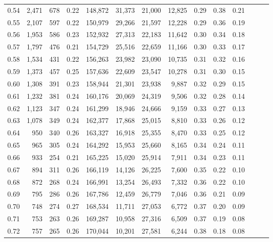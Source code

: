 \begin{tabular}{rrrrrrrrrrrrrr}
0.54 &  2,471 &  678 &  0.22 &  148,872 &   31,373 &  21,000 &  12,825 &  0.29 &  0.38 &      0.21 \\
0.55 &  2,107 &  597 &  0.22 &  150,979 &   29,266 &  21,597 &  12,228 &  0.29 &  0.36 &      0.19 \\
0.56 &  1,953 &  586 &  0.23 &  152,932 &   27,313 &  22,183 &  11,642 &  0.30 &  0.34 &      0.18 \\
0.57 &  1,797 &  476 &  0.21 &  154,729 &   25,516 &  22,659 &  11,166 &  0.30 &  0.33 &      0.17 \\
0.58 &  1,534 &  431 &  0.22 &  156,263 &   23,982 &  23,090 &  10,735 &  0.31 &  0.32 &      0.16 \\
0.59 &  1,373 &  457 &  0.25 &  157,636 &   22,609 &  23,547 &  10,278 &  0.31 &  0.30 &      0.15 \\
0.60 &  1,308 &  391 &  0.23 &  158,944 &   21,301 &  23,938 &   9,887 &  0.32 &  0.29 &      0.15 \\
0.61 &  1,232 &  381 &  0.24 &  160,176 &   20,069 &  24,319 &   9,506 &  0.32 &  0.28 &      0.14 \\
0.62 &  1,123 &  347 &  0.24 &  161,299 &   18,946 &  24,666 &   9,159 &  0.33 &  0.27 &      0.13 \\
0.63 &  1,078 &  349 &  0.24 &  162,377 &   17,868 &  25,015 &   8,810 &  0.33 &  0.26 &      0.12 \\
0.64 &    950 &  340 &  0.26 &  163,327 &   16,918 &  25,355 &   8,470 &  0.33 &  0.25 &      0.12 \\
0.65 &    965 &  305 &  0.24 &  164,292 &   15,953 &  25,660 &   8,165 &  0.34 &  0.24 &      0.11 \\
0.66 &    933 &  254 &  0.21 &  165,225 &   15,020 &  25,914 &   7,911 &  0.34 &  0.23 &      0.11 \\
0.67 &    894 &  311 &  0.26 &  166,119 &   14,126 &  26,225 &   7,600 &  0.35 &  0.22 &      0.10 \\
0.68 &    872 &  268 &  0.24 &  166,991 &   13,254 &  26,493 &   7,332 &  0.36 &  0.22 &      0.10 \\
0.69 &    795 &  286 &  0.26 &  167,786 &   12,459 &  26,779 &   7,046 &  0.36 &  0.21 &      0.09 \\
0.70 &    748 &  274 &  0.27 &  168,534 &   11,711 &  27,053 &   6,772 &  0.37 &  0.20 &      0.09 \\
0.71 &    753 &  263 &  0.26 &  169,287 &   10,958 &  27,316 &   6,509 &  0.37 &  0.19 &      0.08 \\
0.72 &    757 &  265 &  0.26 &  170,044 &   10,201 &  27,581 &   6,244 &  0.38 &  0.18 &      0.08 \\

\end{tabular}
